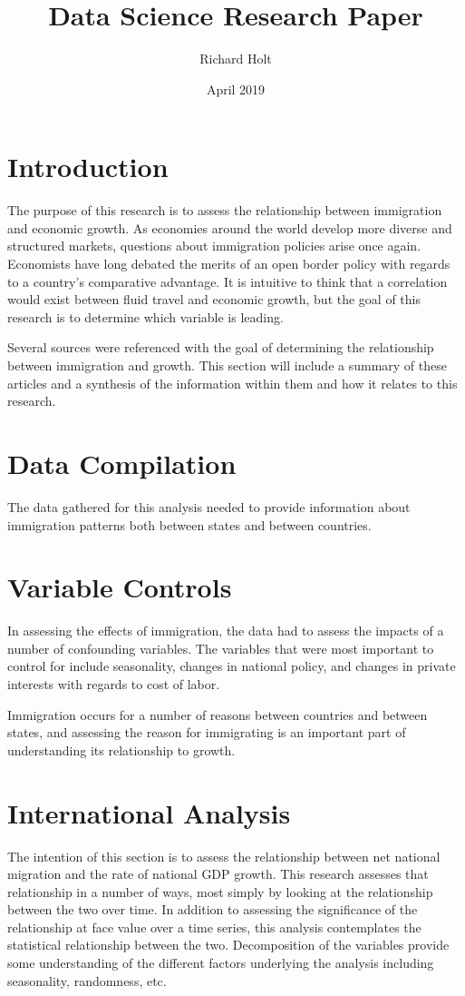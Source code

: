 \documentclass{article}
\title{Data Science Research Paper}
\author{Richard Holt}
\date{April 2019}
\begin{document}
\maketitle

\section{Introduction}
The purpose of this research is to assess the relationship between immigration and economic growth. As economies around the world develop more diverse and structured markets, questions about immigration policies arise once again. Economists have long debated the merits of an open border policy with regards to a country's comparative advantage. It is intuitive to think that a correlation would exist between fluid travel and economic growth, but the goal of this research is to determine which variable is leading.

Several sources were referenced with the goal of determining the relationship between immigration and growth. This section will include a summary of these articles and a synthesis of the information within them and how it relates to this research.
\citep{schou:2006}
\citep{dancygier:2012}
\citep{migrants}
\citep{hanson:2017}
\citep{simpson:2013}
\section{Data Compilation}
The data gathered for this analysis needed to provide information about immigration patterns both between states and between countries. 

\section{Variable Controls}
In assessing the effects of immigration, the data had to assess the impacts of a number of confounding variables. The variables that were most important to control for include
seasonality, changes in national policy, and changes in private interests with regards to cost of labor.

Immigration occurs for a number of reasons between countries and between states, and assessing the reason for immigrating is an important part of understanding its relationship to growth.

\section{International Analysis}
The intention of this section is to assess the relationship between net national migration and the rate of national GDP growth. This research assesses that relationship in a number of ways, most simply by looking at the relationship between the two over time. In addition to assessing the significance of the relationship at face value over a time series, this analysis contemplates the statistical relationship between the two. Decomposition of the variables provide some understanding of the different factors underlying the analysis including seasonality, randomness, etc.
\end{document}
